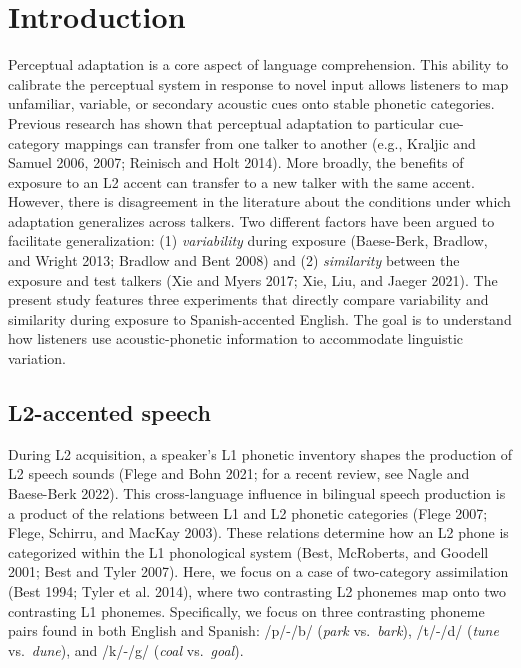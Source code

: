 \documentclass[
  preprint]{elsarticle}
\author{}
\date{\vspace{-2.5em}}
\begin{document}
\hypertarget{introduction}{%
\section{Introduction}\label{introduction}}

Perceptual adaptation is a core aspect of language comprehension.
This ability to calibrate the perceptual system in response to novel input allows listeners to map unfamiliar, variable, or secondary acoustic cues onto stable phonetic categories.
Previous research has shown that perceptual adaptation to particular cue-category mappings can transfer from one talker to another (e.g., Kraljic and Samuel 2006, 2007; Reinisch and Holt 2014).
More broadly, the benefits of exposure to an L2 accent can transfer to a new talker with the same accent.
However, there is disagreement in the literature about the conditions under which adaptation generalizes across talkers.
Two different factors have been argued to facilitate generalization: (1) \emph{variability} during exposure (Baese-Berk, Bradlow, and Wright 2013; Bradlow and Bent 2008) and (2) \emph{similarity} between the exposure and test talkers (Xie and Myers 2017; Xie, Liu, and Jaeger 2021).
The present study features three experiments that directly compare variability and similarity during exposure to Spanish-accented English.
The goal is to understand how listeners use acoustic-phonetic information to accommodate linguistic variation.

\hypertarget{l2-accented-speech}{%
\subsection{L2-accented speech}\label{l2-accented-speech}}

During L2 acquisition, a speaker's L1 phonetic inventory shapes the production of L2 speech sounds (Flege and Bohn 2021; for a recent review, see Nagle and Baese-Berk 2022).
This cross-language influence in bilingual speech production is a product of the relations between L1 and L2 phonetic categories (Flege 2007; Flege, Schirru, and MacKay 2003).
These relations determine how an L2 phone is categorized within the L1 phonological system (Best, McRoberts, and Goodell 2001; Best and Tyler 2007).
Here, we focus on a case of two-category assimilation (Best 1994; Tyler et al. 2014), where two contrasting L2 phonemes map onto two contrasting L1 phonemes.
Specifically, we focus on three contrasting phoneme pairs found in both English and Spanish: /p/-/b/ (\emph{park} vs.~\emph{bark}), /t/-/d/ (\emph{tune} vs.~\emph{dune}), and /k/-/g/ (\emph{coal} vs.~\emph{goal}).
\end{document}
